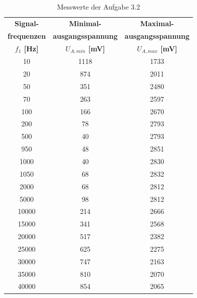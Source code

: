\documentclass[12pt]{scrartcl}
\begin{document}
\newpage
\begin{table}[H] 
    \centering
    \begin{tabular}{|c|c|c|} 
          \hline \textbf{Signal-} & \textbf{Minimal-} & \textbf{Maximal-}\\ 
          \textbf{frequenzen} &\textbf{ausgangsspannung}&\textbf{ausgangsspannung}\\
          \textbf{ $f_1$ [Hz]}    & \textbf{$U_{A,min}$ [mV]} &  \textbf{$U_{A,max}$ [mV]}   \\ \hline
            10    & 1118 & 1733 \\ \hline
            20    & 874  & 2011 \\ \hline
            50    & 351  & 2480 \\ \hline
            70    & 263  & 2597 \\ \hline
            100   & 166  & 2670 \\ \hline
            200   & 78   & 2793 \\ \hline
            500   & 40   & 2793 \\ \hline
            950   & 48   & 2851 \\ \hline
            1000  & 40   & 2830 \\ \hline
            1050  & 68   & 2832 \\ \hline
            2000  & 68   & 2812 \\ \hline
            5000  & 98   & 2812 \\ \hline
            10000 & 214  & 2666 \\ \hline
            15000 & 341  & 2568 \\ \hline
            20000 & 517  & 2382 \\ \hline
            25000 & 625  & 2275 \\ \hline
            30000 & 747  & 2163 \\ \hline
            35000 & 810  & 2070 \\ \hline
            40000 & 854  & 2065 \\ \hline 
    \end{tabular}
    \caption{Messwerte der Aufgabe 3.2} \label{tab:Aufgabe3.2}
\end{table}
\newpage
\end{document}
